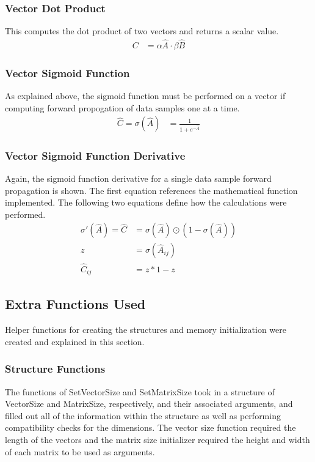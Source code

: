 \documentclass[11pt]{article}
\begin{document}
\subsubsection{Vector Dot Product}
This computes the dot product of two vectors and returns a scalar value.
\begin{align*}
	C & = \alpha \hat{A} \cdot \beta \hat{B} 
\end{align*}

\subsubsection{Vector Sigmoid Function}
As explained above, the sigmoid function must be performed on a vector if computing forward propogation of data samples one at a time.
\begin{align*}
	\hat{C} = \sigma(\hat{A}) & = \frac{1}{1 + e^{-\hat{A}}} 
\end{align*}

\subsubsection{Vector Sigmoid Function Derivative}
Again, the sigmoid function derivative for a single data sample forward propagation is shown. The first equation references the mathematical function implemented. The following two equations define how the calculations were performed.
\begin{align*}
	\sigma'(\hat{A}) = \hat{C} & = \sigma(\hat{A}) \odot (1 - \sigma(\hat{A})) \\
	z                          & = \sigma(\hat{A}_{ij})                        \\
	\hat{C}_{ij}               & = z * 1-z                                     
\end{align*}

\subsection{Extra Functions Used}
Helper functions for creating the structures and memory initialization were created and explained in this section.

\subsubsection{Structure Functions}
The functions of SetVectorSize and SetMatrixSize took in a structure of VectorSize and MatrixSize, respectively, and their associated arguments, and filled out all of the information within the structure as well as performing compatibility checks for the dimensions. The vector size function required the length of the vectors and the matrix size initializer required the height and width of each matrix to be used as arguments.
\end{document}
